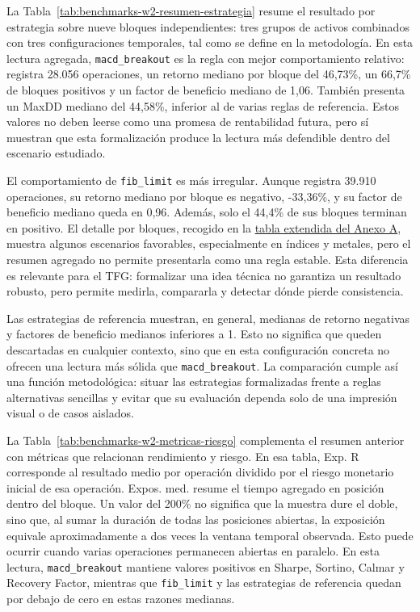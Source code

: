 





La Tabla~\ref{tab:benchmarks-w2-resumen-estrategia} resume el resultado por
estrategia sobre nueve bloques independientes: tres grupos de activos
combinados con tres configuraciones temporales, tal como se define en la
metodolog\'ia. En esta lectura agregada, \texttt{macd\_breakout} es la regla con
mejor comportamiento relativo: registra 28.056 operaciones, un retorno mediano
por bloque del 46,73\%, un 66,7\% de bloques positivos y un factor de beneficio
mediano de 1,06. Tambi\'en presenta un MaxDD mediano del 44,58\%, inferior al de
varias reglas de referencia. Estos valores no deben leerse como una promesa de
rentabilidad futura, pero s\'i muestran que esta formalizaci\'on produce la lectura
m\'as defendible dentro del escenario estudiado.

El comportamiento de \texttt{fib\_limit} es m\'as irregular. Aunque registra
39.910 operaciones, su retorno mediano por bloque es negativo, -33,36\%, y su
factor de beneficio mediano queda en 0,96. Adem\'as, solo el 44,4\% de sus bloques
terminan en positivo. El detalle por bloques, recogido en la
\hyperref[sec:anexos-tabla-extendida-benchmark]{tabla extendida del Anexo A},
muestra
algunos escenarios favorables, especialmente en \'indices y metales, pero el
resumen agregado no permite presentarla como una regla estable. Esta diferencia
es relevante para el TFG: formalizar una idea t\'ecnica no garantiza un resultado
robusto, pero permite medirla, compararla y detectar d\'onde pierde consistencia.

Las estrategias de referencia muestran, en general, medianas de retorno
negativas y factores de beneficio medianos inferiores a 1. Esto no significa que
queden descartadas en cualquier contexto, sino que en esta configuraci\'on
concreta no ofrecen una lectura m\'as s\'olida que \texttt{macd\_breakout}. La
comparaci\'on cumple as\'i una funci\'on metodol\'ogica: situar las estrategias
formalizadas frente a reglas alternativas sencillas y evitar que su evaluaci\'on
dependa solo de una impresi\'on visual o de casos aislados.

La Tabla~\ref{tab:benchmarks-w2-metricas-riesgo} complementa el resumen anterior
con m\'etricas que relacionan rendimiento y riesgo. En esa tabla, Exp. R
corresponde al resultado medio por operaci\'on dividido por el riesgo monetario
inicial de esa operaci\'on. Expos. med. resume el tiempo agregado en posici\'on
dentro del bloque. Un valor del 200\% no significa que la muestra dure el doble,
sino que, al sumar la duraci\'on de todas las posiciones abiertas, la exposici\'on
equivale aproximadamente a dos veces la ventana temporal observada. Esto puede
ocurrir cuando varias operaciones permanecen abiertas en paralelo. En esta
lectura, \texttt{macd\_breakout} mantiene valores positivos en Sharpe, Sortino,
Calmar y Recovery Factor, mientras que \texttt{fib\_limit} y las estrategias de
referencia quedan por debajo de cero en estas razones medianas.

